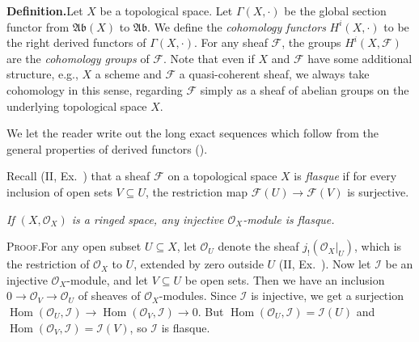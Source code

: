 {\par\smallskip\noindent\textbf{Definition.}\enspace Let $X$ be a topological space. Let $\Gamma(X,\cdot)$ be the global section functor from $\mathfrak{Ab}(X)$ to $\mathfrak{Ab}$. We define the \emph{cohomology functors} $H^i(X,\cdot)$ to be the right derived functors of $\Gamma(X,\cdot)$. For any sheaf $\mathcal F$, the groups $H^i(X,\mathcal F)$ are the \emph{cohomology groups} of $\mathcal F$. Note that even if $X$ and $\mathcal F$ have some additional structure, e.g., $X$ a scheme and $\mathcal F$ a quasi-coherent sheaf, we always take cohomology in this sense, regarding $\mathcal F$ simply as a sheaf of abelian groups on the underlying topological space $X$.

We let the reader write out the long exact sequences which follow from the general properties of derived functors ().

\medskip
Recall (II, Ex.~) that a sheaf $\mathcal F$ on a topological space $X$ is \emph{flasque} if for every inclusion of open sets $V\subseteq U$, the restriction map $\mathcal F(U)\to\mathcal F(V)$ is surjective.

 \emph{If $(X,\mathcal O_X)$ is a ringed space, any injective $\mathcal O_X$-module is flasque.}

\par\smallskip\noindent\textsc{Proof.}\enspace For any open subset $U\subseteq X$, let $\mathcal O_U$ denote the sheaf $j_!(\mathcal O_X|_U)$, which is the restriction of $\mathcal O_X$ to $U$, extended by zero outside $U$ (II, Ex.~). Now let $\mathcal I$ be an injective $\mathcal O_X$-module, and let $V\subseteq U$ be open sets. Then we have an inclusion $0\to\mathcal O_V\to\mathcal O_U$ of sheaves of $\mathcal O_X$-modules. Since $\mathcal I$ is injective, we get a surjection $\operatorname{Hom}(\mathcal O_U,\mathcal I)\to\operatorname{Hom}(\mathcal O_V,\mathcal I)\to0$. But $\operatorname{Hom}(\mathcal O_U,\mathcal I)=\mathcal I(U)$ and $\operatorname{Hom}(\mathcal O_V,\mathcal I)=\mathcal I(V)$, so $\mathcal I$ is flasque.
}
